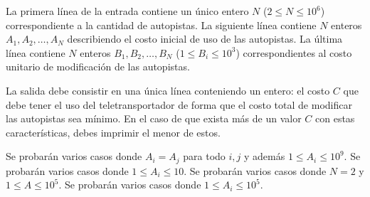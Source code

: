 \documentclass{oci}
\begin{document}
\begin{inputDescription}
  La primera línea de la entrada contiene un único entero $N$ ($2 \leq N \leq
  10^6$) correspondiente a la cantidad de autopistas.
  La siguiente línea contiene $N$ enteros $A_1, A_2, \ldots, A_N$ describiendo el
  costo inicial de uso de las autopistas.
  La última línea contiene $N$ enteros $B_1, B_2, \ldots, B_N$ ($1 \leq B_i \leq
  10^3$) correspondientes al costo unitario de modificación de las autopistas.
\end{inputDescription}

\begin{outputDescription}
  La salida debe consistir en una única línea conteniendo un entero: el costo
  $C$ que debe tener el uso del teletransportador de forma que el costo total de
  modificar las autopistas sea mínimo.
  En el caso de que exista más de un valor $C$ con estas características, debes
  imprimir el menor de estos.
\end{outputDescription}

\begin{scoreDescription}
   Se probarán varios casos donde $A_i=A_j$ para todo $i,j$ y además
  $1 \leq A_i \leq 10^9$.
   Se probarán varios casos donde $1 \leq A_i \leq 10$.
   Se probarán varios casos donde $N=2$ y $1\leq A \leq 10^5$.
   Se probarán varios casos donde $1\leq A_i\leq 10^5$.
\end{scoreDescription}

\begin{sampleDescription}
\end{sampleDescription}
\end{document}
